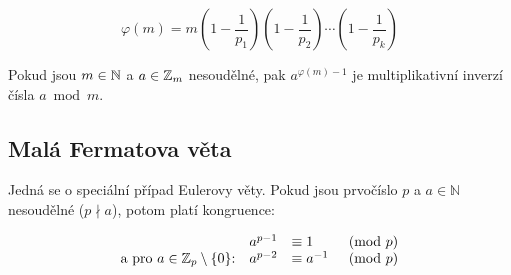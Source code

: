 \[
    \varphi(m) = m
    \left( 1 - \frac{1}{p_1} \right)
    \left( 1 - \frac{1}{p_2} \right)\cdots
    \left( 1 - \frac{1}{p_k} \right)
\]

Pokud jsou $m \in \mathbb{N}$ a $a \in \mathbb{Z}_m$ nesoudělné, pak $a^{\varphi(m)-1}$ je multiplikativní inverzí čísla $a \bmod m$.

\subsection{Malá Fermatova věta}

Jedná se o speciální případ Eulerovy věty. Pokud jsou prvočíslo $p$ a $a \in \mathbb N$ nesoudělné ($p \nmid a$), potom platí kongruence:

\[
    \begin{array}{rll}
        a^{p-1}                                               & \equiv 1 & \pmod{p}     \\
        \text{a pro $a\in \mathbb{Z}_p\setminus\{0\}$:} \quad a^{p-2} & \equiv a^{-1} & \pmod p
    \end{array}
\]